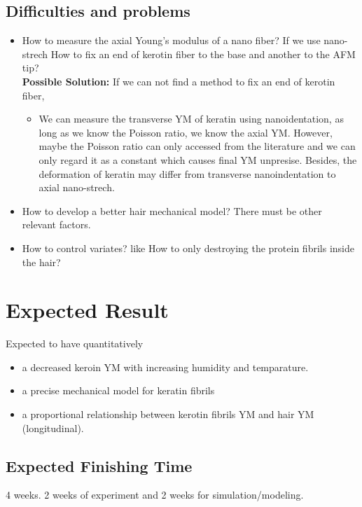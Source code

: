 \documentclass{article}
\begin{document}
\subsection{Difficulties and problems}
\begin{itemize}
	    \item How to measure the axial Young's modulus of a nano fiber? If we use nano-strech How to fix an end of kerotin fiber to the base and another to the AFM tip?\\

   \textbf{Possible Solution:}  If we can not find a 	method to fix an end of kerotin fiber, 
				\begin{itemize}
						\item We can measure the transverse YM of keratin using nanoidentation, as long as we know the Poisson ratio, we know the axial YM. However, maybe the Poisson ratio can only accessed from the literature and we can only regard it as a constant which causes final YM unpresise. Besides, the deformation of keratin may differ from transverse nanoindentation  to axial nano-strech.
				\end{itemize}
             
    
    \item How to develop a better hair mechanical model? There must be other relevant factors.

	\item How to control variates? like How to only destroying the protein fibrils inside the hair?


\end{itemize}


\section{Expected Result}
Expected to have quantitatively
\begin{itemize}
	
	\item  a decreased keroin YM with increasing humidity and temparature.
	\item  a precise mechanical model for keratin fibrils
	 \item a proportional relationship between kerotin fibrils YM and hair YM (longitudinal). 
\end{itemize}
\subsection{Expected Finishing Time}
4 weeks. 2 weeks of experiment and 2 weeks for simulation/modeling.



\end{document}
